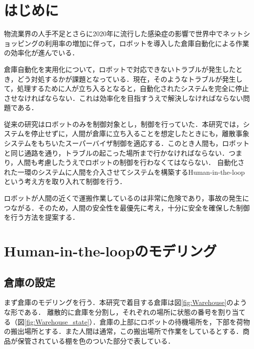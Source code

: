 \section{{はじめに}}
物流業界の人手不足とさらに2020年に流行した感染症の影響で世界中でネットショッピングの利用率の増加\cite{soumu}に伴って，ロボットを導入した倉庫自動化による作業の効率化が進んでいる．

倉庫自動化を実用化について，ロボットで対応できないトラブルが発生したとき，どう対処するかが課題となっている．現在，そのようなトラブルが発生して，処理するために人が立ち入るとなると，自動化されたシステムを完全に停止させなければならない．これは効率化を目指すうえで解決しなければならない問題である．

従来の研究\cite{Pre_research}はロボットのみを制御対象とし，制御を行っていた．本研究では，システムを停止せずに，人間が倉庫に立ち入ることを想定したときにも，離散事象システムをもちいたスーパーバイザ制御を適応する\cite{SupervisoryControlOfDES}．このとき人間も，ロボットと同じ通路を通り，トラブルの起こった場所まで行かなければならない．つまり，人間も考慮したうえでロボットの制御を行わなくてはならない．
自動化された一環のシステムに人間を介入させてシステムを構築するHuman-in-the-loopという考え方を取り入れて制御を行う\cite{HITLref_3}．

ロボットが人間の近くで運搬作業しているのは非常に危険であり，事故の発生につながる．そのため，人間の安全性を最優先に考え，十分に安全を確保した制御を行う方法を提案する．

\section{{Human-in-the-loopのモデリング}}
\subsection{倉庫の設定}
まず倉庫のモデリングを行う．本研究で着目する倉庫は図\ref{fig:Warehouse}のような形である．
離散的に倉庫を分割し，それぞれの場所に状態の番号を割り当てる（図\ref{fig:Warehouse_state}）．倉庫の上部にロボットの待機場所を，下部を荷物の搬出場所とする．また人間は通常，この搬出場所で作業をしているとする．商品が保管されている棚を色のついた部分で表している．

